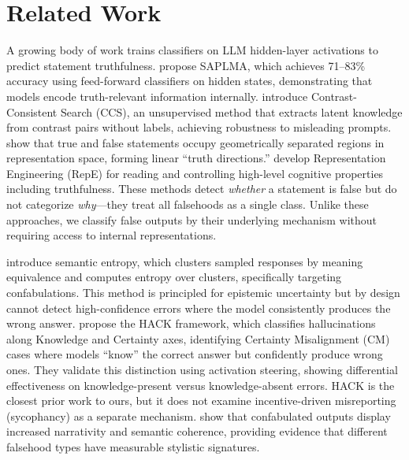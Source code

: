 \section{Related Work}
\label{sec:related}

A growing body of work trains classifiers on LLM hidden-layer activations to predict statement truthfulness. \citet{azaria2023internal} propose SAPLMA, which achieves 71--83\% accuracy using feed-forward classifiers on hidden states, demonstrating that models encode truth-relevant information internally. \citet{burns2022discovering} introduce Contrast-Consistent Search (CCS), an unsupervised method that extracts latent knowledge from contrast pairs without labels, achieving robustness to misleading prompts. \citet{marks2023geometry} show that true and false statements occupy geometrically separated regions in representation space, forming linear ``truth directions.'' \citet{li2023representation} develop Representation Engineering (RepE) for reading and controlling high-level cognitive properties including truthfulness. These methods detect \emph{whether} a statement is false but do not categorize \emph{why}---they treat all falsehoods as a single class. Unlike these approaches, we classify false outputs by their underlying mechanism without requiring access to internal representations.

\citet{farquhar2024detecting} introduce semantic entropy, which clusters sampled responses by meaning equivalence and computes entropy over clusters, specifically targeting confabulations. This method is principled for epistemic uncertainty but by design cannot detect high-confidence errors where the model consistently produces the wrong answer. \citet{simhi2025hack} propose the HACK framework, which classifies hallucinations along Knowledge and Certainty axes, identifying Certainty Misalignment (CM) cases where models ``know'' the correct answer but confidently produce wrong ones. They validate this distinction using activation steering, showing differential effectiveness on knowledge-present versus knowledge-absent errors. HACK is the closest prior work to ours, but it does not examine incentive-driven misreporting (sycophancy) as a separate mechanism. \citet{sui2024confabulation} show that confabulated outputs display increased narrativity and semantic coherence, providing evidence that different falsehood types have measurable stylistic signatures.

